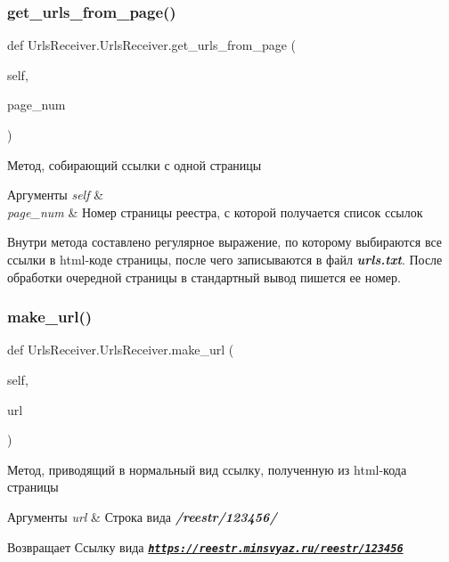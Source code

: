 \subsubsection{\texorpdfstring{get\+\_\+urls\+\_\+from\+\_\+page()}{get\_urls\_from\_page()}}
{\footnotesize\ttfamily def Urls\+Receiver.\+Urls\+Receiver.\+get\+\_\+urls\+\_\+from\+\_\+page (\begin{DoxyParamCaption}\item[{}]{self,  }\item[{}]{page\+\_\+num }\end{DoxyParamCaption})}



Метод, собирающий ссылки с одной страницы 


\begin{DoxyParams}{Аргументы}
{\em self} & \\
\hline
{\em page\+\_\+num} & Номер страницы реестра, с которой получается список ссылок\\
\hline
\end{DoxyParams}
Внутри метода составлено регулярное выражение, по которому выбираются все ссылки в html-\/коде страницы, после чего записываются в файл {\itshape {\bfseries urls.\+txt}}. После обработки очередной страницы в стандартный вывод пишется ее номер. \mbox{\label{classUrlsReceiver_1_1UrlsReceiver_a1dfd347420ffce5e3c510feb8a436d30}} 
\subsubsection{\texorpdfstring{make\+\_\+url()}{make\_url()}}
{\footnotesize\ttfamily def Urls\+Receiver.\+Urls\+Receiver.\+make\+\_\+url (\begin{DoxyParamCaption}\item[{}]{self,  }\item[{}]{url }\end{DoxyParamCaption})}



Метод, приводящий в нормальный вид ссылку, полученную из html-\/кода страницы 


\begin{DoxyParams}{Аргументы}
{\em url} & Строка вида {\itshape {\bfseries /reestr/123456/}} \\
\hline
\end{DoxyParams}
\begin{DoxyReturn}{Возвращает}
Ссылку вида {\itshape {\bfseries \href{https://reestr.minsvyaz.ru/reestr/123456}{\tt https\+://reestr.\+minsvyaz.\+ru/reestr/123456}}} 
\end{DoxyReturn}
\mbox{\label{classUrlsReceiver_1_1UrlsReceiver_abf0eed73148dbb302da0b4a09efb4940}} 
